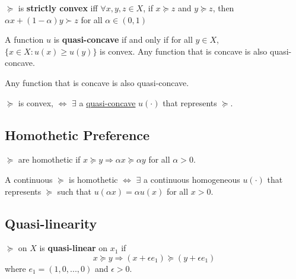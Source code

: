 \documentclass[11pt]{elegantbook}
\begin{document}
\begin{definition}
    \normalfont
    $\succeq$ is \textbf{strictly convex} iff $\forall x, y, z \in X$, if $x \succeq z$ and $y \succeq z$, then $\alpha x+(1-\alpha) y \succ z$ for all $\alpha\in (0,1)$
\end{definition}

\begin{definition}
    \normalfont
    A function $u$ is \textbf{quasi-concave} if and only if for all $y\in X$, $\{x\in X: u(x)\geq u(y)\}$ is convex. Any function that is concave is also quasi-concave.
\end{definition}
\begin{proposition}
    Any function that is concave is also quasi-concave.
\end{proposition}


\begin{proposition}
    $\succeq$ is convex, $\Leftrightarrow$ $\exists$ a \underline{quasi-concave} $u(\cdot)$ that represents $\succeq$.
\end{proposition}


\subsection{Homothetic Preference}
\begin{definition}[Homotheticity]
    \normalfont
    $\succeq$ are homothetic if $x\succeq y \Rightarrow \alpha x\succeq \alpha y$ for all $\alpha>0$.
\end{definition}

\begin{proposition}
    A continuous $\succeq$ is homothetic $\Leftrightarrow$ $\exists$ a continuous homogeneous $u(\cdot)$ that represents $\succeq$ such that $u(\alpha x)=\alpha u(x)$ for all $x>0$.
\end{proposition}


\subsection{Quasi-linearity}
\begin{definition}
    \normalfont
    $\succeq$ on $X$ is \textbf{quasi-linear} on $x_1$ if $$x\succeq y \Rightarrow (x+\epsilon e_1)\succeq (y+\epsilon e_1)$$ where $e_1=(1,0,...,0)$ and $\epsilon>0$.
\end{definition}
\end{document}
